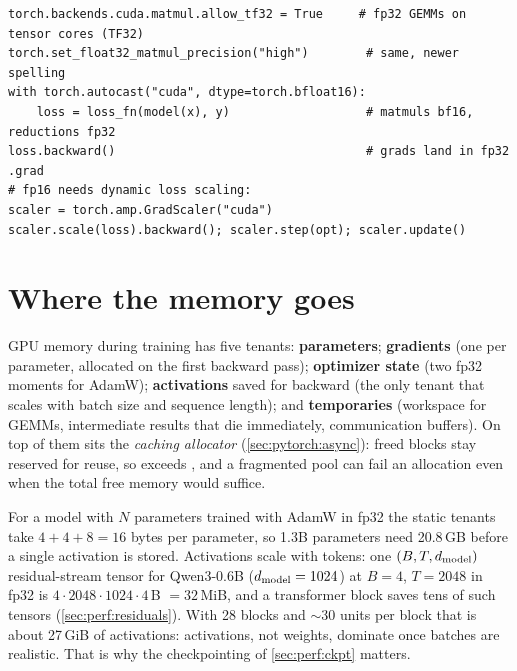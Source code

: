 \begin{lstlisting}[caption={Precision switches worth knowing.},label={lst:perf:ampknobs}]
torch.backends.cuda.matmul.allow_tf32 = True     # fp32 GEMMs on tensor cores (TF32)
torch.set_float32_matmul_precision("high")        # same, newer spelling
with torch.autocast("cuda", dtype=torch.bfloat16):
    loss = loss_fn(model(x), y)                   # matmuls bf16, reductions fp32
loss.backward()                                   # grads land in fp32 .grad
# fp16 needs dynamic loss scaling:
scaler = torch.amp.GradScaler("cuda")
scaler.scale(loss).backward(); scaler.step(opt); scaler.update()
\end{lstlisting}

\section{Where the memory goes}\label{sec:perf:memory}

GPU memory during training has five tenants: \textbf{parameters}; \textbf{gradients} (one per
parameter, allocated on the first backward pass); \textbf{optimizer state} (two fp32 moments for
AdamW); \textbf{activations} saved for backward (the only tenant that scales with batch size and
sequence length); and \textbf{temporaries} (workspace for GEMMs, intermediate results that die
immediately, communication buffers). On top of them sits the \emph{caching allocator}
(\cref{sec:pytorch:async}): freed blocks stay reserved for reuse, so
 exceeds , and a fragmented pool can
fail an allocation even when the total free memory would suffice.

\begin{napkinmath}
For a model with $N$ parameters trained with AdamW in fp32 the static tenants take
$4+4+8=16$ bytes per parameter, so 1.3B parameters need 20.8\,GB before a single activation is
stored. Activations scale with tokens: one $(B,T,d_{\text{model}})$ residual-stream tensor for Qwen3-0.6B
($d_{\text{model}}=1024$) at $B=4$, $T=2048$ in fp32 is $4\cdot2048\cdot1024\cdot4$\,B $=32$\,MiB, and a
transformer block saves tens of such tensors (\cref{sec:perf:residuals}). With 28 blocks and
$\sim$30 units per block that is about 27\,GiB of activations: activations, not weights, dominate
once batches are realistic. That is why the checkpointing of \cref{sec:perf:ckpt} matters.
\end{napkinmath}

